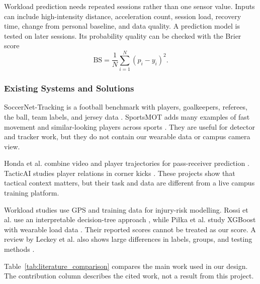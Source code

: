 Workload prediction needs repeated sessions rather than one sensor value.
Inputs can include high-intensity distance, acceleration count, session load,
recovery time, change from personal baseline, and data quality. A prediction
model is tested on later sessions. Its probability quality can be checked with
the Brier score
\begin{equation}
\mathrm{BS}=\frac{1}{N}\sum_{i=1}^{N}(p_i-y_i)^2.
\end{equation}

\subsubsection{Existing Systems and Solutions}
SoccerNet-Tracking is a football benchmark with players, goalkeepers,
referees, the ball, team labels, and jersey data \cite{cioppa2022soccernet}.
SportsMOT adds many examples of fast movement and similar-looking players
across sports \cite{cui2023sportsmot}. They are useful for detector and tracker
work, but they do not contain our wearable data or campus camera view.

Honda et al. combine video and player trajectories for pass-receiver prediction
\cite{honda2022pass}. TacticAI studies player relations in corner kicks
\cite{tacticai2024}. These projects show that tactical context matters, but
their task and data are different from a live campus training platform.

Workload studies use GPS and training data for injury-risk modelling. Rossi et
al. use an interpretable decision-tree approach \cite{rossi2018injury}, while
Pi{\l}ka et al. study XGBoost with wearable load data \cite{pilka2023workload}.
Their reported scores cannot be treated as our score. A review by Leckey et al.
also shows large differences in labels, groups, and testing methods
\cite{leckey2025injury}.

Table~\ref{tab:literature_comparison} compares the main work used in our design.
The contribution column describes the cited work, not a result from this
project.

